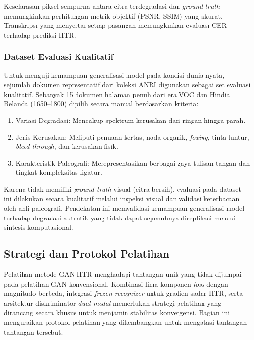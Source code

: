 \documentclass[12pt,a4paper]{article}
\begin{document}
Keselarasan piksel sempurna antara citra terdegradasi dan \textit{ground truth} memungkinkan perhitungan metrik objektif (PSNR, SSIM) yang akurat. Transkripsi yang menyertai setiap pasangan memungkinkan evaluasi CER terhadap prediksi HTR.

\subsubsection{Dataset Evaluasi Kualitatif}

Untuk menguji kemampuan generalisasi model pada kondisi dunia nyata, sejumlah dokumen representatif dari koleksi ANRI digunakan sebagai set evaluasi kualitatif. Sebanyak 15 dokumen halaman penuh dari era VOC dan Hindia Belanda (1650--1800) dipilih secara manual berdasarkan kriteria:
\begin{enumerate}[label=\alph*., leftmargin=1.5em, labelsep=0.5em, noitemsep]
  \item Variasi Degradasi: Mencakup spektrum kerusakan dari ringan hingga parah.
  \item Jenis Kerusakan: Meliputi penuaan kertas, noda organik, \textit{foxing}, tinta luntur, \textit{bleed-through}, dan kerusakan fisik.
  \item Karakteristik Paleografi: Merepresentasikan berbagai gaya tulisan tangan dan tingkat kompleksitas ligatur.
\end{enumerate}

Karena tidak memiliki \textit{ground truth} visual (citra bersih), evaluasi pada dataset ini dilakukan secara kualitatif melalui inspeksi visual dan validasi keterbacaan oleh ahli paleografi. Pendekatan ini memvalidasi kemampuan generalisasi model terhadap degradasi autentik yang tidak dapat sepenuhnya direplikasi melalui sintesis komputasional.

\subsection{Strategi dan Protokol Pelatihan}
\label{subsec:detail-implementasi-training}

Pelatihan metode GAN-HTR menghadapi tantangan unik yang tidak dijumpai pada pelatihan GAN konvensional. Kombinasi lima komponen \textit{loss} dengan magnitudo berbeda, integrasi \textit{frozen recognizer} untuk gradien sadar-HTR, serta arsitektur diskriminator \textit{dual-modal} memerlukan strategi pelatihan yang dirancang secara khusus untuk menjamin stabilitas konvergensi. Bagian ini menguraikan protokol pelatihan yang dikembangkan untuk mengatasi tantangan-tantangan tersebut.
\end{document}
